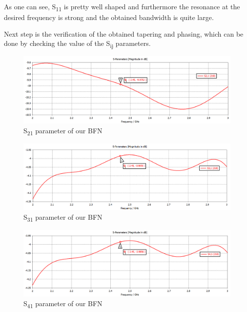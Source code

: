 \par\medskip
\noindent
As one can see, S\textsubscript{11} is pretty well shaped and furthermore the resonance at the desired frequency is strong and the obtained bandwidth is quite large.

\par\medskip
\noindent
Next step is the verification of the obtained tapering and phasing, which can be done by checking the value of the S\textsubscript{ij} parameters.

\begin{figure}[H]
\centering
\includegraphics[scale=0.35]{S21Amp.png}
\caption{S\textsubscript{21} parameter of our BFN}
\label{S21Amp}
\end{figure}

\begin{figure}[H]
\centering
\includegraphics[scale=0.35]{S31Amp.png}
\caption{S\textsubscript{31} parameter of our BFN}
\label{S31Amp}
\end{figure}

\begin{figure}[H]
\centering
\includegraphics[scale=0.35]{S41Amp.png}
\caption{S\textsubscript{41} parameter of our BFN}
\label{S41Amp}
\end{figure}

